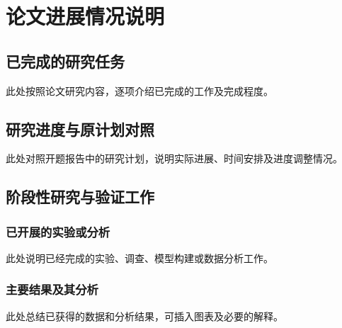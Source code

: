\chapter{论文进展情况说明}

\section{已完成的研究任务}
此处按照论文研究内容，逐项介绍已完成的工作及完成程度。

\section{研究进度与原计划对照}
此处对照开题报告中的研究计划，说明实际进展、时间安排及进度调整情况。

\section{阶段性研究与验证工作}
\subsection{已开展的实验或分析}
此处说明已经完成的实验、调查、模型构建或数据分析工作。

\subsection{主要结果及其分析}
此处总结已获得的数据和分析结果，可插入图表及必要的解释。

